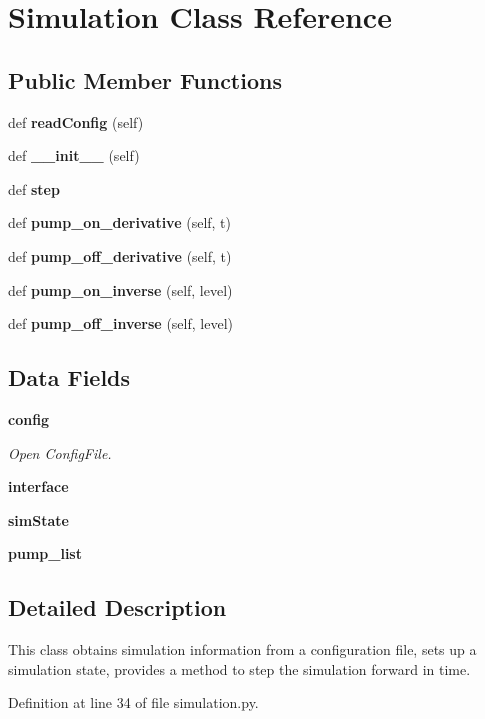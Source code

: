 \section{Simulation Class Reference}
\label{classsims_1_1tcpwater_1_1simulation_1_1_simulation}
\subsection*{Public Member Functions}
\begin{DoxyCompactItemize}
\item 
def {\bf read\+Config} (self)
\item 
def {\bf \+\_\+\+\_\+init\+\_\+\+\_\+} (self)
\item 
def {\bf step}
\item 
def {\bf pump\+\_\+on\+\_\+derivative} (self, t)
\item 
def {\bf pump\+\_\+off\+\_\+derivative} (self, t)
\item 
def {\bf pump\+\_\+on\+\_\+inverse} (self, level)
\item 
def {\bf pump\+\_\+off\+\_\+inverse} (self, level)
\end{DoxyCompactItemize}
\subsection*{Data Fields}
\begin{DoxyCompactItemize}
\item 
{\bf config}
\begin{DoxyCompactList}\small\item\em Open Config\+File. \end{DoxyCompactList}\item 
{\bf interface}
\item 
{\bf sim\+State}
\item 
{\bf pump\+\_\+list}
\end{DoxyCompactItemize}


\subsection{Detailed Description}
\begin{DoxyVerb}This class obtains simulation information from a configuration file,
    sets up a simulation state, provides a method to step the simulation
    forward in time.\end{DoxyVerb}
 

Definition at line 34 of file simulation.\+py.



